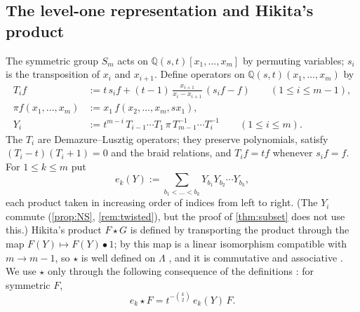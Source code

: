 \documentclass[11pt]{amsart}
\theoremstyle{definition}
\theoremstyle{remark}
\numberwithin{equation}{section}
\newcommand{\Lam}{\Lambda}
\begin{document}
\subsection{The level-one representation and Hikita's product}
The symmetric group $S_m$ acts on $\mathbb{Q}(s,t)[x_1,\dots,x_m]$ by permuting variables; $s_i$ is the transposition of $x_i$ and $x_{i+1}$. Define operators on $\mathbb{Q}(s,t)(x_1,\dots,x_m)$ by
\begin{align*}
T_if&:=t\,s_if+(t-1)\,\frac{x_{i+1}}{x_i-x_{i+1}}\,(s_if-f)\qquad(1\le i\le m-1),\\
\pi f(x_1,\dots,x_m)&:=x_1\,f(x_2,\dots,x_m,sx_1),\\
Y_i&:=t^{m-i}\,T_{i-1}\cdots T_1\,\pi\,T_{m-1}^{-1}\cdots T_i^{-1}\qquad(1\le i\le m).
\end{align*}
The $T_i$ are Demazure--Lusztig operators; they preserve polynomials, satisfy $(T_i-t)(T_i+1)=0$ and the braid relations, and $T_if=tf$ whenever $s_if=f$. For $1\le k\le m$ put
\[ e_k(Y):=\sum_{b_1<\dots<b_k}Y_{b_1}Y_{b_2}\cdots Y_{b_k}, \]
each product taken in increasing order of indices from left to right. (The $Y_i$ commute (\cref{prop:NS}, \cref{rem:twisted}), but the proof of \cref{thm:subset} does not use this.) Hikita's product $F\star G$ is defined by transporting the product through the map $F(Y)\mapsto F(Y)\bullet1$; by \cite[Lemma~3.1, Cor.~3.9]{Hikita25} this map is a linear isomorphism compatible with $m\to m-1$, so $\star$ is well defined on $\Lam$ \cite[Cor.~3.10]{Hikita25}, and it is commutative and associative \cite[\S3.2, after Def.~3.4]{Hikita25}. We use $\star$ only through the following consequence of the definitions \cite[Def.~3.4, Lemma~3.3]{Hikita25}: for symmetric $F$,
\begin{equation}\label{eq:star-reading}
e_k\star F=t^{-\binom k2}\,e_k(Y)\,F .
\end{equation}
\end{document}
